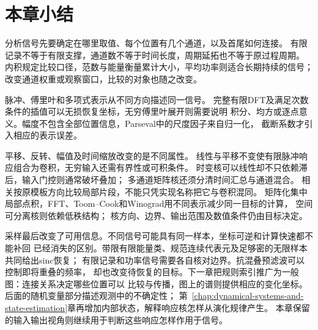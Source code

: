 \section{本章小结}
\label{sec:signal-analysis-summary}

分析信号先要确定在哪里取值、每个位置有几个通道，以及首尾如何连接。
有限记录不等于有限支撑，通道数不等于时间长度，周期延拓也不等于原过程周期。
内积规定比较口径，范数与能量衡量累计大小，平均功率则适合长期持续的信号；
改变通道权重或观察窗口，比较的对象也随之改变。

脉冲、傅里叶和多项式表示从不同方向描述同一信号。
完整有限DFT及满足次数条件的插值可以无损恢复坐标，无穷傅里叶展开则需要说明
积分、均方或逐点意义。幅度不包含全部位置信息，Parseval中的尺度因子来自归一化，
截断系数才引入相应的表示误差。

平移、反转、幅值及时间缩放改变的是不同属性。
线性与平移不变使有限脉冲响应组合为卷积，无穷输入还需有界性或可积条件。
时变核可以线性却不只依赖滞后，输入门控则通常破坏叠加；
多通道矩阵核还须分清时间汇总与通道混合。
相关按原模板方向比较局部片段，不能只凭实现名称把它与卷积混同。
矩阵化集中局部点积，FFT、Toom--Cook和Winograd用不同表示减少同一目标的计算，
空间可分离核则依赖低秩结构；
核方向、边界、输出范围及数值条件仍由目标决定。

采样最后改变了可用信息。不同信号可能具有同一样本，坐标可逆和计算快速都不能补回
已经消失的区别。带限有限能量类、规范连续代表元及足够密的无限样本共同给出sinc恢复；
有限记录和功率信号需要各自核对边界。抗混叠预滤波可以控制即将重叠的频率，
却也改变待恢复的目标。下一章把规则索引推广为一般图：连接关系决定哪些位置可以
比较与传播，图上的谱则提供相应的变化坐标。后面的随机变量部分描述观测中的不确定性；
第~\ref{chap:dynamical-systems-and-state-estimation}章再增加内部状态，解释响应核怎样从演化规律产生。
本章保留的输入输出视角则继续用于判断这些响应怎样作用于信号。
